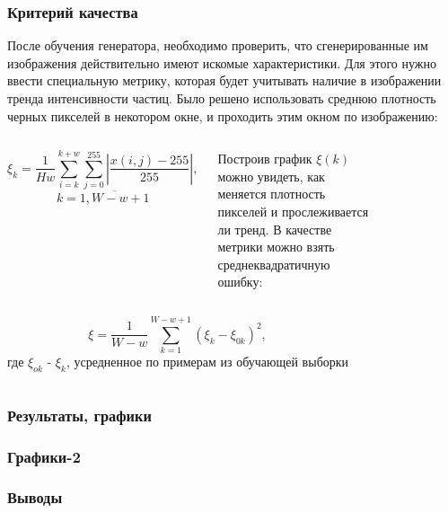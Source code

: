 \documentclass[9pt]{beamer}
\begin{document}
\begin{frame}\frametitle{Критерий качества}
	После обучения генератора, необходимо проверить, что сгенерированные им изображения действительно имеют искомые характеристики. Для этого нужно ввести специальную метрику, которая будет учитывать наличие в изображении тренда интенсивности частиц. Было решено использовать среднюю плотность черных пикселей в некотором окне, и проходить этим окном по изображению:
	\begin{columns}
			\begin{center}
				$$\xi_k = \frac{1}{H w}{\sum_{i=k}^{k+w} \sum_{j=0}^{255}\left| \frac{x(i, j) - 255}{255} \right|}, $$$$k = \overline{1, W - w + 1} $$
			\end{center}
			Построив график $\xi(k)$ можно увидеть, как меняется плотность пикселей и прослеживается ли тренд. В качестве метрики можно взять среднеквадратичную ошибку:
			\begin{figure}
			\end{figure}
	\end{columns}
	\begin{columns}
		\column{0.5\linewidth}
			$$ \xi = \frac{1}{W-w}\sum_{k=1}^{W-w+1} (\xi_k - \xi_{0k})^2,$$
		\column{0.5\linewidth}
			где $\xi_{ok}$ - $\xi_k$, усредненное по примерам из обучающей выборки
	\end{columns}
\end{frame}

\begin{frame}\frametitle{Результаты, графики}
	
\end{frame}

\begin{frame}\frametitle{Графики-2}
\end{frame}

\begin{frame}\frametitle{Выводы}
\end{frame}
\end{document}
